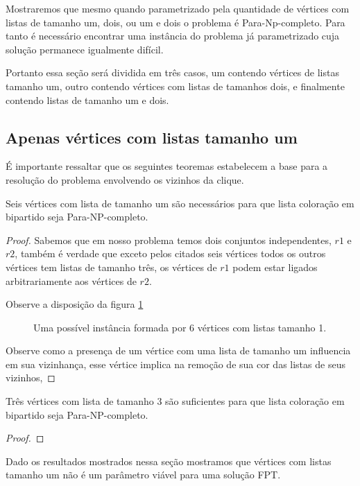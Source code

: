 Mostraremos que mesmo quando parametrizado pela quantidade de vértices com listas de tamanho um, dois, ou um e dois o problema é Para-Np-completo. Para tanto é necessário encontrar uma instância do problema já parametrizado cuja solução permanece igualmente difícil.

Portanto essa seção será dividida em três casos, um contendo vértices de listas tamanho um, outro contendo vértices com listas de tamanhos dois, e finalmente contendo listas de tamanho um e dois.
\subsection{Apenas vértices com listas tamanho um}
É importante ressaltar que os seguintes teoremas estabelecem a base para a resolução do problema envolvendo os vizinhos da clique. 
\begin{teorema}
  Seis vértices com lista de tamanho um são necessários para que lista coloração em bipartido seja Para-NP-completo. 
\end{teorema}
\begin{proof}
 Sabemos que em nosso problema temos dois conjuntos independentes, $r1$ e $r2$, também é verdade que exceto pelos citados seis vértices todos os outros vértices tem listas de tamanho três, os vértices de $r1$ podem estar ligados arbitrariamente aos vértices de $r2$. 
 
 Observe a disposição da figura \ref{fig:seis-vertices-lista-um}
 
\begin{figure}[H]
		\centering
		
		\caption{Uma possível instância formada por 6 vértices com listas tamanho 1. }
		\label{fig:seis-vertices-lista-um}
\end{figure}

Observe como a presença de um vértice com uma lista de tamanho um influencia em sua vizinhança, esse vértice implica na remoção de sua cor das listas de seus vizinhos, 

\end{proof}

\begin{teorema}
  Três vértices com lista de tamanho 3 são suficientes para que lista coloração em bipartido seja Para-NP-completo.
\end{teorema}
\begin{proof}
\end{proof}
 Dado os resultados mostrados nessa seção mostramos que vértices com listas tamanho um não é um parâmetro viável para uma solução FPT. 
